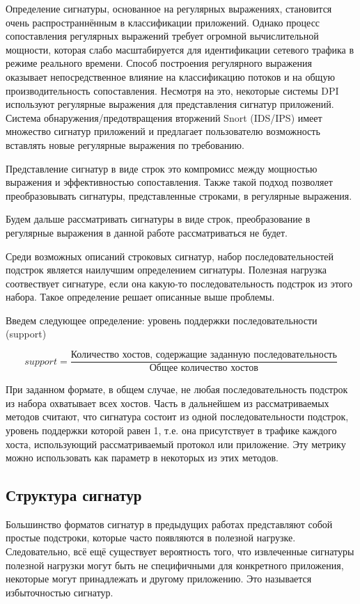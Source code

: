 Определение сигнатуры, основанное на регулярных выражениях, становится очень распространнённым в классификации приложений.
Однако процесс сопоставления регулярных выражений требует огромной вычислительной мощности,
которая слабо масштабируется для идентификации сетевого трафика в режиме реального времени.
Способ построения регулярного выражения оказывает непосредственное влияние на классификацию потоков и на общую производительность сопоставления.
Несмотря на это, некоторые системы DPI используют регулярные выражения для представления сигнатур приложений.
Система обнаружения/предотвращения вторжений Snort (IDS/IPS) \cite{Snort}
имеет множество сигнатур приложений и предлагает пользователю возможность вставлять новые регулярные выражения по требованию.

Представление сигнатур в виде строк это компромисс между мощностью выражения и эффективностью сопоставления.
Также такой подход позволяет преобразовывать сигнатуры, представленные строками, в регулярные выражения.

Будем дальше рассматривать сигнатуры в виде строк, преобразование в регулярные выражения в данной работе рассматриваться не будет.

Среди возможных описаний строковых сигнатур, набор последовательностей подстрок является наилучшим определением сигнатуры.
Полезная нагрузка соотвествует сигнатуре, если она какую-то последовательность подстрок из этого набора. Такое определение решает описанные выше проблемы.

Введем следующее определение: уровень поддержки последовательности (support)

\[ support = \dfrac{\text{Количество хостов, содержащие заданную последовательность}}{\text{Общее количество хостов}} \]

При заданном формате, в общем случае, не любая последовательность подстрок из набора охватывает всех хостов.
Часть в дальнейшем из рассматриваемых методов считают, что сигнатура состоит из одной последовательности подстрок, уровень поддержки которой равен 1,
т.е. она присутствует в трафике каждого хоста, использующий рассматриваемый протокол или приложение.
Эту метрику можно использовать как параметр в некоторых из этих методов.

\subsection{Структура сигнатур}

Большинство форматов сигнатур в предыдущих работах \cite{park2008towards,ye2009autosig,santosautomatic} представляют собой простые подстроки, которые часто появляются в полезной нагрузке.
Следовательно, всё ещё существует вероятность того, что извлеченные сигнатуры полезной нагрузки могут быть не специфичными для конкретного приложения,
некоторые могут принадлежать и другому приложению. Это называется избыточностью сигнатур.

